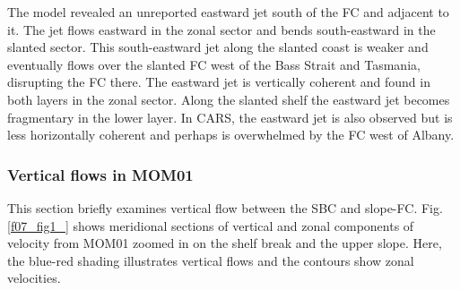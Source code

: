\documentclass[preprint,3p,review,12pt]{elsarticle}
\begin{document}
The model revealed an unreported eastward jet south of the FC and adjacent to it. The jet flows eastward in the zonal sector and bends south-eastward in the slanted sector. This south-eastward jet along the slanted coast is weaker and eventually flows over the slanted FC west of the Bass Strait and Tasmania, disrupting the FC there.
The eastward jet is vertically coherent and found
in both layers in the zonal sector. Along the slanted shelf the eastward jet becomes fragmentary in the lower layer.
In CARS, the eastward jet is also observed but is less horizontally coherent and perhaps is overwhelmed by the FC west of Albany.

\subsubsection{Vertical flows in MOM01} \label{Vertical flows in MOM01}
This section briefly examines vertical flow between the SBC 
and slope-FC\@. Fig.\,\ref{f07_fig1_} shows meridional sections of vertical and zonal components of velocity from MOM01 zoomed in on the shelf break
and the upper slope.
Here, the blue-red shading illustrates vertical flows and the contours show zonal velocities.
\end{document}
